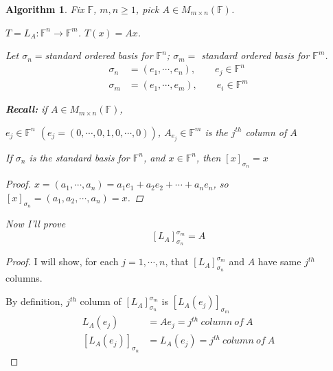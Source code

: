 \documentclass[12pt]{article}
\newtheorem{algorithm}{Algorithm}[subsection]
\newcommand{\mF}{{\mathbb{F}}}
\begin{document}
	\begin{algorithm}
		Fix $\mF$, $m,n \geq 1$, pick $A \in M_{m\times n}(\mF)$. 

		$T = L_A : \mF^n \to \mF^m$. $T(x) = Ax$. 

		Let $\sigma_n= $standard ordered basis for $\mF^n$; 
		$\sigma_m=$ standard ordered basis for $\mF^m$. 
		\begin{align*}
			\sigma_n &= (e_1, \cdots, e_n), \qquad e_j \in \mF^n \\
			\sigma_m &= (e_1,\cdots, e_m), \qquad e_i \in \mF^m 
		\end{align*}

		\textbf{Recall:} if $A \in M_{m\times n} (\mF)$, 
		
		$e_j \in \mF^n$ $(e_j = (0, \cdots, 0, 1, 0, \cdots, 0))$, 
		$A_{e_j} \in \mF^m$ is the $j^{th}$ column of $A$ 

		If $\sigma_n$ is the standard basis for $\mF^n$, and $x \in \mF^n$, 
		then $[x]_{\sigma_n} =x$
		\begin{proof}
			$x = (a_1,\cdots, a_n) = a_1e_1 + a_2e_2+\cdots+a_ne_n$,
			so $[x]_{\sigma_n} = (a_1,a_2,\cdots,a_n)=x$.
		\end{proof}

		Now I'll prove 
		\[
			[L_A]^{\sigma_m}_{\sigma_n} = A
		\]
	\end{algorithm}
	\begin{proof}
		I will show, for each $j = 1, \cdots, n$, that 
		$[L_A]^{\sigma_m}_{\sigma_n}$ and $A$ have same $j^{th}$ columns. 

		By definition, $j^{th}$ column of $[L_A]^{\sigma_m}_{\sigma_n}$ is 
		$[L_A(e_j)]_{\sigma_m}$
		\begin{align*}
			L_A(e_j) &= Ae_j=j^{th} \ column \ of \ A\\
			[L_A(e_j)]_{\sigma_n} &= L_A(e_j) = j^{th} \ column \ of \ A
		\end{align*}
	\end{proof}
\end{document}
